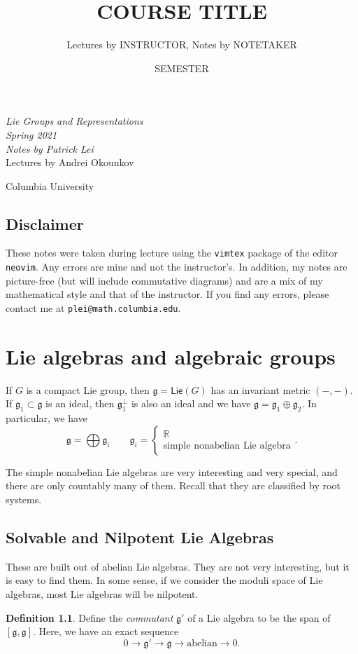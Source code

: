 \documentclass[leqno, openany]{memoir}
\title{COURSE TITLE}
\author{Lectures by INSTRUCTOR, Notes by NOTETAKER}
\date{SEMESTER}
\theoremstyle{definition}
\newtheorem{defn}[thm]{Definition}
\theoremstyle{remark}
\theoremstyle{plain}
\theoremstyle{definition}
\theoremstyle{remark}
\newcommand{\R}{\mathbb{R}}
\newcommand{\mf}[1]{\mathfrak{#1}}
\newcommand{\ms}[1]{\mathsf{#1}}
\newcommand*{\titleSW}
    {\begingroup%
    \raggedleft
    \vspace*{\baselineskip}
    {\Huge\itshape Lie Groups and Representations \\ Spring 2021}\\[\baselineskip]
    {\large\itshape Notes by Patrick Lei}\\[0.2\textheight]
    {\Large Lectures by Andrei Okounkov}\par
    \vfill
    {\Large \sffamily Columbia University}
    \vspace*{\baselineskip}
\endgroup}
\begin{document}
    
\begin{titlingpage}
\titleSW
\end{titlingpage}

\thispagestyle{empty}
\section*{Disclaimer}%
\label{sec:disclaimer}

These notes were taken during lecture using the \texttt{vimtex} package of the editor \texttt{neovim}. 
Any errors are mine and not the instructor's. 
In addition, my notes are picture-free (but will include commutative diagrams) and are a mix of my mathematical style and that of the instructor.
If you find any errors, please contact me at \texttt{plei@math.columbia.edu}.
\newpage

\tableofcontents

\chapter{Lie algebras and algebraic groups}%
\label{cha:semisimple_lie_algebras}

If $G$ is a compact Lie group, then $\mf{g} = \ms{Lie}(G)$ has an invariant metric $(-,-)$. If $\mf{g}_1 \subset \mf{g}$ is an ideal, then $\mf{g}_1^{\perp}$ is also an ideal and we have $\mf{g} = \mf{g}_1 \oplus \mf{g}_2$. In particular, we have 
\[ \mf{g} = \bigoplus \mf{g}_i \qquad \mf{g}_i = \begin{cases}
    \R \\
    \text{simple nonabelian Lie algebra}
\end{cases}. \]

The simple nonabelian Lie algebras are very interesting and very special, and there are only countably many of them. Recall that they are classified by root systems. 

\section{Solvable and Nilpotent Lie Algebras}%
\label{sec:solvable_and_nilpotent_lie_algebras}

These are built out of abelian Lie algebras. They are not very interesting, but it is easy to find them. In some sense, if we consider the moduli space of Lie algebras, most Lie algebras will be nilpotent.

\begin{defn}
    Define the \textit{commutant} $\mf{g}'$ of a Lie algebra to be the span of $[\mf{g}, \mf{g}]$. Here, we have an exact sequence
    \[ 0 \to \mf{g}' \to \mf{g} \to \text{abelian} \to 0. \]
\end{defn}
\end{document}
